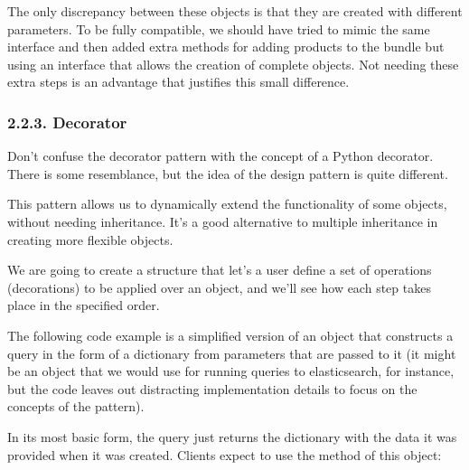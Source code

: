 \documentclass[a4paper,10pt,english]{sphinxmanual}
\begin{document}
The only discrepancy between these objects is that they are created with different
parameters. To be fully compatible, we should have tried to mimic the same interface and
then added extra methods for adding products to the bundle but using an interface that
allows the creation of complete objects. Not needing these extra steps is an advantage that
justifies this small difference.


\subsubsection{2.2.3. Decorator}
\label{\detokenize{chapters/9_design_patterns/index:decorator}}
Don’t confuse the decorator pattern with the concept of a Python decorator. There is some
resemblance, but the idea of the design pattern is quite different.

This pattern allows us to dynamically extend the functionality of some objects, without
needing inheritance. It’s a good alternative to multiple inheritance in creating more flexible
objects.

We are going to create a structure that let’s a user define a set of operations (decorations) to
be applied over an object, and we’ll see how each step takes place in the specified order.

The following code example is a simplified version of an object that constructs a query in
the form of a dictionary from parameters that are passed to it (it might be an object that we
would use for running queries to elasticsearch, for instance, but the code leaves out
distracting implementation details to focus on the concepts of the pattern).

In its most basic form, the query just returns the dictionary with the data it was provided
when it was created. Clients expect to use the  method of this object:

\begin{sphinxVerbatim}[commandchars=\\\{\}]
 
      
          

       
         
\end{sphinxVerbatim}
\end{document}
